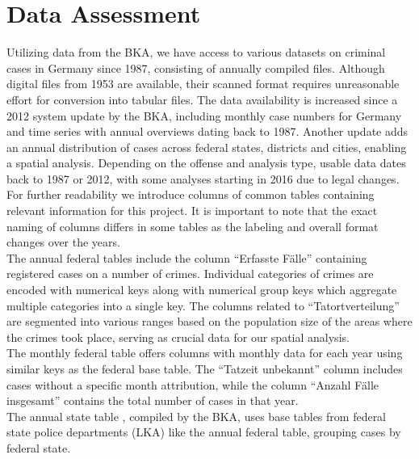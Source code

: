 \documentclass{article}
\theoremstyle{plain}
\theoremstyle{definition}
\theoremstyle{remark}
\begin{document}
\section{Data Assessment}\label{sec:methods}
\label{data_and_methods}

Utilizing data from the BKA, we have access to various datasets on criminal cases in Germany since 1987, consisting of annually compiled files. Although digital files from 1953 are available, their scanned format requires unreasonable effort for conversion into tabular files.
The data availability is increased since a 2012 system update by the BKA, including monthly case numbers for Germany and time series with annual overviews dating back to 1987.
Another update adds an annual distribution of cases across federal states, districts and cities, enabling a spatial analysis. Depending on the offense and analysis type, usable data dates back to 1987 or 2012, with some analyses starting in 2016 due to legal changes.\\
For further readability we introduce columns of common tables containing relevant information for this project. It is important to note that the exact naming of columns differs in some tables as the labeling and overall format changes over the years.\\
The annual federal tables \citep{PKS-Overview} \citep{BU-T01-2022} include the column \textquotedblleft{}Erfasste Fälle\textquotedblright{} containing registered cases on a number of crimes. Individual categories of crimes are encoded with numerical keys along with numerical group keys which aggregate multiple categories into a single key. The columns related to \textquotedblleft{}Tatortverteilung\textquotedblright{} are segmented into various ranges based on the population size of the areas where the crimes took place, serving as crucial data for our spatial analysis.\\
The monthly federal table \citep{BU-T08-2022} offers columns with monthly data for each year using similar keys as the federal base table. The \textquotedblleft{}Tatzeit unbekannt\textquotedblright{} column includes cases without a specific month attribution, while the column \textquotedblleft{}Anzahl Fälle insgesamt\textquotedblright{} contains the total number of cases in that year.\\
The annual state table \citep{LA-T01-2022}, compiled by the BKA, uses base tables from federal state police departments (LKA) like the annual federal table, grouping cases by federal state.
\end{document}
